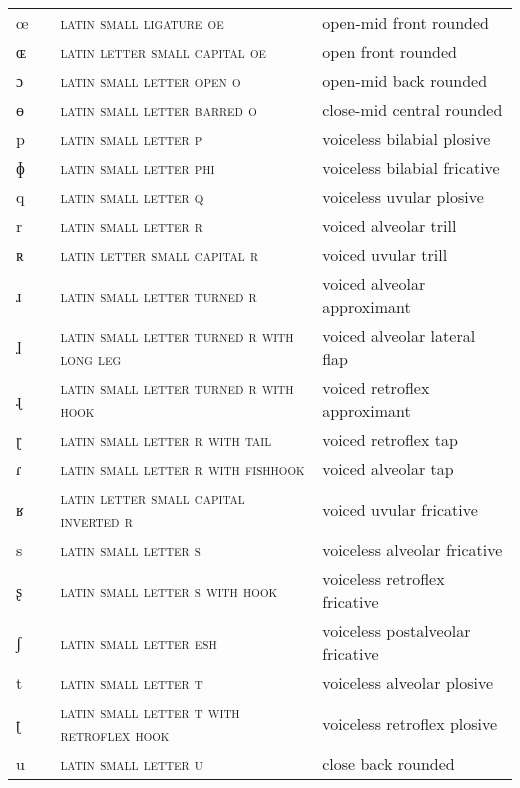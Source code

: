 \begin{center}
\begin{xtabular}{ l l L{4.5cm} L{4.5cm} }
œ &  & \textsc{latin small ligature oe} & open-mid front rounded \\ 
ɶ &  & \textsc{latin letter small capital oe} & open front rounded \\ 
ɔ &  & \textsc{latin small letter open o} & open-mid back rounded \\ 
ɵ &  & \textsc{latin small letter barred o} & close-mid central rounded \\ 
p &  & \textsc{latin small letter p} & voiceless bilabial plosive \\ 
ɸ &  & \textsc{latin small letter phi} & voiceless bilabial fricative \\ 
q &  & \textsc{latin small letter q} & voiceless uvular plosive \\ 
r &  & \textsc{latin small letter r} & voiced alveolar trill \\ 
ʀ &  & \textsc{latin letter small capital r} & voiced uvular trill \\ 
ɹ &  & \textsc{latin small letter turned r} & voiced alveolar approximant \\ 
ɺ &  & \textsc{latin small letter turned r with long leg} & voiced alveolar lateral flap \\ 
ɻ &  & \textsc{latin small letter turned r with hook} & voiced retroflex approximant \\ 
ɽ &  & \textsc{latin small letter r with tail} & voiced retroflex tap \\ 
ɾ &  & \textsc{latin small letter r with fishhook} & voiced alveolar tap \\ 
ʁ &  & \textsc{latin letter small capital inverted r} & voiced uvular fricative \\ 
s &  & \textsc{latin small letter s} & voiceless alveolar fricative \\ 
ʂ &  & \textsc{latin small letter s with hook} & voiceless retroflex fricative \\ 
ʃ &  & \textsc{latin small letter esh} & voiceless postalveolar fricative \\ 
t &  & \textsc{latin small letter t} & voiceless alveolar plosive \\ 
ʈ &  & \textsc{latin small letter t with retroflex hook} & voiceless retroflex plosive \\ 
u &  & \textsc{latin small letter u} & close back rounded \\ 

\end{xtabular}
\end{center}
